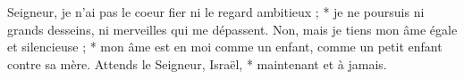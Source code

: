 Seigneur, je n'ai pas le coeur fier ni le regard ambitieux ; * je ne poursuis ni grands desseins, ni merveilles qui me dépassent.
\versseparator
Non, mais je tiens mon âme égale et silencieuse ; * mon âme est en moi comme un enfant, comme un petit enfant contre sa mère.
\versseparator
Attends le Seigneur, Israël, * maintenant et à jamais.
